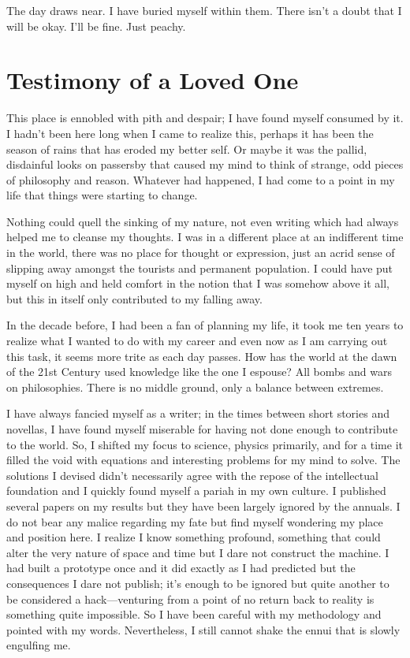 The day draws near. I have buried myself within them. There isn't a
doubt that I will be okay. I'll be fine. Just peachy.

\chapter{Testimony of a Loved One}\label{testimony-of-a-loved-one}

This place is ennobled with pith and despair; I have found myself
consumed by it. I hadn't been here long when I came to realize this,
perhaps it has been the season of rains that has eroded my better self.
Or maybe it was the pallid, disdainful looks on passersby that caused my
mind to think of strange, odd pieces of philosophy and reason. Whatever
had happened, I had come to a point in my life that things were starting
to change.

Nothing could quell the sinking of my nature, not even writing which had
always helped me to cleanse my thoughts. I was in a different place at
an indifferent time in the world, there was no place for thought or
expression, just an acrid sense of slipping away amongst the tourists
and permanent population. I could have put myself on high and held
comfort in the notion that I was somehow above it all, but this in
itself only contributed to my falling away.

In the decade before, I had been a fan of planning my life, it took me
ten years to realize what I wanted to do with my career and even now as
I am carrying out this task, it seems more trite as each day passes. How
has the world at the dawn of the 21st Century used knowledge like the
one I espouse? All bombs and wars on philosophies. There is no middle
ground, only a balance between extremes.

I have always fancied myself as a writer; in the times between short
stories and novellas, I have found myself miserable for having not done
enough to contribute to the world. So, I shifted my focus to science,
physics primarily, and for a time it filled the void with equations and
interesting problems for my mind to solve. The solutions I devised
didn't necessarily agree with the repose of the intellectual foundation
and I quickly found myself a pariah in my own culture. I published
several papers on my results but they have been largely ignored by the
annuals. I do not bear any malice regarding my fate but find myself
wondering my place and position here. I realize I know something
profound, something that could alter the very nature of space and time
but I dare not construct the machine. I had built a prototype once and
it did exactly as I had predicted but the consequences I dare not
publish; it's enough to be ignored but quite another to be considered a
hack---venturing from a point of no return back to reality is something
quite impossible. So I have been careful with my methodology and pointed
with my words. Nevertheless, I still cannot shake the ennui that is
slowly engulfing me.

